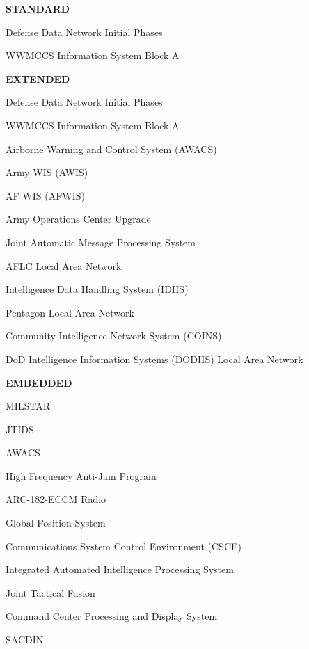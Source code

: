 \documentclass[12pt,final]{article}
\begin{document}
\begin{landscape}
\newpage


\begin{center}
\begin{multicols*}{4}
\raggedcolumns %
\raggedright

    \textbf{STANDARD}

    Defense Data Network Initial Phases

    WWMCCS Information System Block A

    \columnbreak

    \textbf{EXTENDED}

    Defense Data Network Initial Phases

    WWMCCS Information System Block A

    Airborne Warning and Control System (AWACS)

    Army WIS (AWIS)

    AF WIS (AFWIS)

    Army Operations Center Upgrade

    Joint Automatic Message Processing System

    AFLC Local Area Network

    Intelligence Data Handling System (IDHS)

    Pentagon Local Area Network

    Community Intelligence Network System (COINS)

    DoD Intelligence Information Systems (DODIIS) Local Area Network

    \columnbreak

    \textbf{EMBEDDED}

    MILSTAR

    JTIDS

    AWACS

    High Frequency Anti-Jam Program

    ARC-182-ECCM Radio

    Global Position System

    Communications System Control Environment (CSCE)

    Integrated Automated Intelligence Processing System

    Joint Tactical Fusion

    Command Center Processing and Display System

    SACDIN


\end{multicols*}
\end{center}
\end{landscape}
\end{document}
